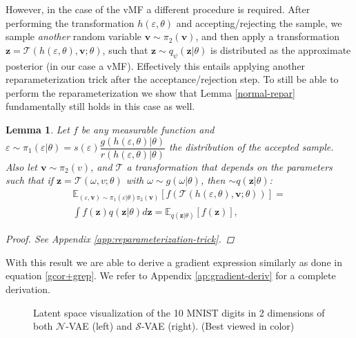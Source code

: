 \documentclass[letterpaper]{article}
\newtheorem{lem}{\textbf{Lemma}}
\newcommand{\E}{\mathbb{E}}
\newcommand{\z}{\mathbf{z}}
\newcommand{\vv}{\mathbf{v}}
\begin{document}
However, in the case of the vMF a different procedure is required. After performing the transformation $h(\varepsilon, \theta)$ and accepting/rejecting the sample, we sample \textit{another} random variable $\vv \sim\pi_2(\vv)$, and then apply a transformation $\z = \mathcal{T}(h(\varepsilon, \theta), \vv; \theta)$, such that $\z \sim q_{\psi}(\z| \theta)$ is distributed as the approximate posterior (in our case a vMF). Effectively this entails applying another reparameterization trick after the acceptance/rejection step. To still be able to perform the reparameterization we show that Lemma \ref{normal-repar} fundamentally still holds in this case as well.
\begin{lem}\label{our-repar}
Let $f$ be any measurable function and $\varepsilon \sim \pi_1(\varepsilon| \theta) = s(\varepsilon)\dfrac{g(h(\varepsilon,\theta)| \theta)}{r(h(\varepsilon,\theta)| \theta)}$ the distribution of the accepted sample. 
Also let $\vv \sim\pi_2(v)$, and $\mathcal{T}$ a transformation that depends on the parameters such that if $\z = \mathcal{T}(\omega, v; \theta)$ with $\omega\sim g(\omega|\theta)$, then $ \sim q(\z| \theta) $:
\begin{align}
    \E_{ (\varepsilon,\vv)\sim\pi_1(\varepsilon| \theta)\pi_2(\vv)} \left[f\left(\mathcal{T}(h(\varepsilon, \theta), \vv; \theta)\right)\right] = \nonumber \\
    \int f(\z)q(\z|\theta)d\z = \E_{q(\z|\theta)}[f(\z)],
\end{align}
\begin{proof}
    See Appendix \ref{app:reparameterization-trick}.
\end{proof}
\end{lem}
With this result we are able to derive a gradient expression similarly as done in equation \ref{gcor+grep}. We refer to Appendix \ref{ap:gradient-deriv} for a complete derivation. 

\begin{figure*}[t]
\centering
     \hspace{5em}
      \caption{Latent space visualization of the 10 MNIST digits in 2 dimensions of both $\mathcal{N}$-VAE (left) and $\mathcal{S}$-VAE (right). (Best viewed in color)}
      \label{fig:latent_mnist_z2}
\end{figure*}
\end{document}
